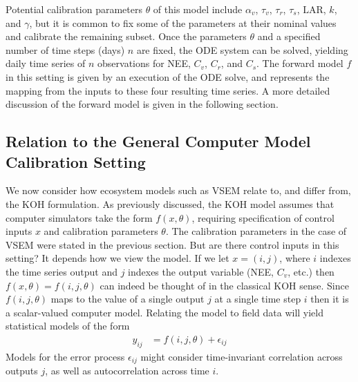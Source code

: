 \documentclass[12pt]{article}
\begin{document}
Potential calibration parameters $\theta$ of this model include $\alpha_v$, $\tau_v$, $\tau_r$, $\tau_s$, $\text{LAR}$, $k$, and $\gamma$, but it is common to fix some of the parameters at their 
nominal values and calibrate the remaining subset. 
Once the parameters $\theta$ and a specified number of time steps (days) $n$ are fixed, the ODE system can be solved, yielding daily time series of $n$
observations for NEE, $C_v$, $C_r$, and $C_s$. The forward model $f$ in this setting is given by an execution of the ODE solve, and represents
the mapping from the inputs to these four resulting time series. A more 
detailed discussion of the forward model is given in the following section. 

\subsection{Relation to the General Computer Model Calibration Setting}
We now consider how ecosystem models such as VSEM relate to, and differ from, the KOH formulation. As previously discussed, the KOH model assumes that
computer simulators take the form $f(x, \theta)$, requiring specification of control inputs $x$ and calibration parameters $\theta$. The calibration parameters 
in the case of VSEM were stated in the previous section. But are there control inputs in this setting? It depends how we view the model. If we let 
$x = (i, j)$, where $i$ indexes the time series output and $j$ indexes the output variable (NEE, $C_v$, etc.) then $f(x, \theta) = f(i, j, \theta)$ can indeed be thought of in the 
classical KOH sense. Since $f(i, j, \theta)$ maps to the value of a single output $j$ at a single time step $i$ then it is a scalar-valued computer model. Relating the 
model to field data will yield statistical models of the form 
\begin{align}
y_{ij} &= f(i, j, \theta) + \epsilon_{ij} \label{ij_model}
\end{align}
Models for the error process $\epsilon_{ij}$ might consider time-invariant correlation across outputs $j$, as well as autocorrelation across time $i$. 
\end{document}
